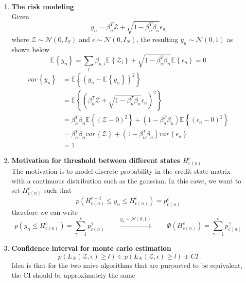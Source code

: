 \documentclass[11pt]{article}
\begin{document}
\renewcommand{\norm}[1]{\left\lVert#1\right\rVert}
\renewcommand{\E}[2][]{\mathbb{E}_{#1}\left\{#2\right\}}
\renewcommand{\var}[2][]{var_{#1}\left\{#2\right\}}
\renewcommand{\cov}[1]{cov\{#1\}} 
\newcommand{\normal}[1]{\mathcal{N}\left(#1\right)}
\newcommand{\exponents}[1]{exp\left\{#1\right\}}
\newcommand{\indicator}[1]{\mathbbm{1}_{#1}}

\renewcommand{\bmu}{\boldsymbol{\mu}}
\renewcommand{\bpi}{\boldsymbol{\pi}}
\newcommand{\bTheta}{\boldsymbol{\Theta}}
\newcommand{\bSigma}{\boldsymbol{\Sigma}}
\renewcommand{\bphi}{\boldsymbol{\phi}}

\newcommand{\calA}{\mathcal{A}}
\newcommand{\calL}{\mathcal{L}}
\newcommand{\calE}{\mathcal{E}}
\newcommand{\calR}{\mathcal{R}}
\newcommand{\calC}{\mathcal{C}}
\newcommand{\calD}{\mathcal{D}}
\newcommand{\calZ}{\mathcal{Z}}



\begin{enumerate}
    \item \textbf{The risk modeling} \\
    Given 
    \[
        y_n = \beta_n^T \calZ + \sqrt{1 - \beta_n^T \beta_n} \epsilon_n
    \]
    where $\calZ \sim \normal{0, I_S}$ and $\epsilon \sim \normal{0, I_N}$, the resulting $y_n \sim \normal{0,1}$ as shown below 
    \[
        \E{y_n} = \sum_{i} \beta_{n,i} \E{\calZ_i} + \sqrt{1 - \beta_n^T \beta_n} \E{\epsilon_n} = 0
    \]
    \begin{align*}
        \var{y_n} 
        &= \E{(y_n - \E{y_n})^2} \\
        &= \E{ (\beta_n^T \calZ + \sqrt{1 - \beta_n^T \beta_n} \epsilon_n)^2 }\\
        &= \beta_n^T \beta_n \E{(\calZ - 0)^2} + (1-\beta_n^T \beta_n) \E{(\epsilon_n - 0)^2} \\
        &= \beta_n^T \beta_n \var{\calZ} + (1-\beta_n^T \beta_n) \var{\epsilon_n} \\
        &= 1
    \end{align*}
    \item \textbf{Motivation for threshold between different states $H_{c(n)}^c$} \\
    The motivation is to model discrete probability in the credit state matrix with a continuous distribution such as the gaussian. In this cawe, we want to set $H_{c(n)}^c$ such that
    \[
        p(H_{c(n)}^{c-1}\leq y_n \leq H_{c(n)}^c) = p_{c(n)}^c
    \]
    therefore we can write 
    \[
        p(y_n \leq H_{c(n)}^c) = \sum_{\gamma = 1}^c p_{c(n)}^{\gamma}
        \qquad 
        \overset{y_n \sim \normal{0,1}}{\longrightarrow} 
        \qquad 
        \Phi(H_{c(n)}^c) = \sum_{\gamma = 1}^c p_{c(n)}^{\gamma}
    \]
    \item \textbf{Confidence interval for monte carlo estimation}
    \[
        p(L_N(\calZ, \epsilon)\geq l) \in 
        p(L_N(\calZ, \epsilon)\geq l) \pm CI
    \]
    Idea is that for the two naive algorithms that are purported to be equivalent, the CI should be approximately the same
\end{enumerate}
\end{document}
